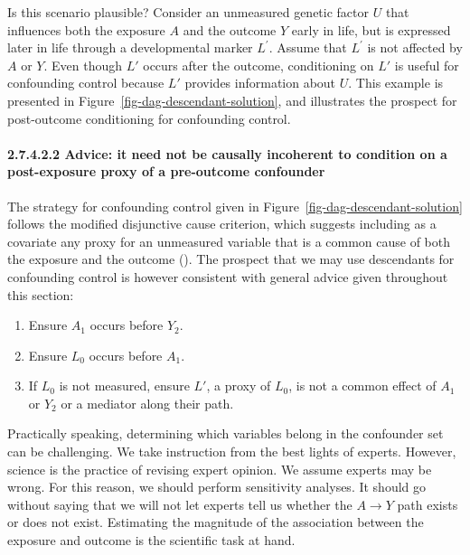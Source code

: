 \documentclass[
  singlecolumn]{article}
\let\oldparagraph\paragraph
\renewcommand{\paragraph}[1]{\oldparagraph{#1}\mbox{}}
\providecommand{\tightlist}{%
  \setlength{\itemsep}{0pt}\setlength{\parskip}{0pt}}\usepackage{longtable,booktabs,array}
\begin{document}
Is this scenario plausible? Consider an unmeasured genetic factor \(U\)
that influences both the exposure \(A\) and the outcome \(Y\) early in
life, but is expressed later in life through a developmental marker
\(L^\prime\). Assume that \(L^\prime\) is not affected by \(A\) or
\(Y\). Even though \(L'\) occurs after the outcome, conditioning on
\(L'\) is useful for confounding control because \(L'\) provides
information about \(U\). This example is presented in
Figure~\ref{fig-dag-descendant-solution}, and illustrates the prospect
for post-outcome conditioning for confounding control.

\paragraph{2.7.4.2.2 Advice: it need not be causally incoherent to
condition on a post-exposure proxy of a pre-outcome
confounder}\label{advice-it-need-not-be-causally-incoherent-to-condition-on-a-post-exposure-proxy-of-a-pre-outcome-confounder}

The strategy for confounding control given in
Figure~\ref{fig-dag-descendant-solution} follows the modified
disjunctive cause criterion, which suggests including as a covariate any
proxy for an unmeasured variable that is a common cause of both the
exposure and the outcome (). The prospect that we may use descendants for confounding control
is however consistent with general advice given throughout this section:

\begin{enumerate}
\def\labelenumi{\arabic{enumi}.}
\tightlist
\item
  Ensure \(A_1\) occurs before \(Y_2\).
\item
  Ensure \(L_0\) occurs before \(A_1\).
\item
  If \(L_0\) is not measured, ensure \(L'\), a proxy of \(L_0\), is not
  a common effect of \(A_1\) or \(Y_2\) or a mediator along their path.
\end{enumerate}

Practically speaking, determining which variables belong in the
confounder set can be challenging. We take instruction from the best
lights of experts. However, science is the practice of revising expert
opinion. We assume experts may be wrong. For this reason, we should
perform sensitivity analyses. It should go without saying that we will
not let experts tell us whether the \(A\to Y\) path exists or does not
exist. Estimating the magnitude of the association between the exposure
and outcome is the scientific task at hand.
\end{document}
